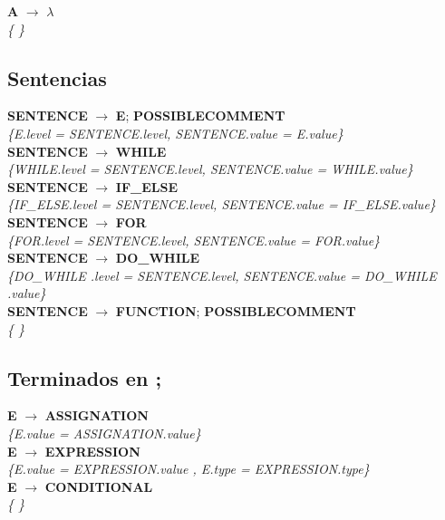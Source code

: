 \documentclass[10pt,a4paper]{article}
\begin{document}
\textbf{A} $\rightarrow$ $\lambda$ \\
\textit{\{   \}} \\

\subsection{Sentencias}
\textbf{SENTENCE} $\rightarrow$ \textbf{E}; \textbf{POSSIBLECOMMENT}\\ 
\textit{\{E.level = SENTENCE.level, SENTENCE.value = E.value\}} \\

\textbf{SENTENCE} $\rightarrow$ \textbf{WHILE} \\ 
\textit{\{WHILE.level = SENTENCE.level, SENTENCE.value = WHILE.value\}} \\

\textbf{SENTENCE} $\rightarrow$ \textbf{IF\_ELSE}  \\ 
\textit{\{IF\_ELSE.level = SENTENCE.level, SENTENCE.value = IF\_ELSE.value\}} \\

\textbf{SENTENCE} $\rightarrow$ \textbf{FOR} \\ 
\textit{\{FOR.level = SENTENCE.level, SENTENCE.value = FOR.value\}} \\

\textbf{SENTENCE} $\rightarrow$ \textbf{DO\_WHILE} \\ 
\textit{\{DO\_WHILE .level = SENTENCE.level, SENTENCE.value = DO\_WHILE .value\}}  \\

\textbf{SENTENCE} $\rightarrow$ \textbf{FUNCTION}; \textbf{POSSIBLECOMMENT} \\
\textit{\{   \}} \\

\subsection{Terminados en ;}

\textbf{E} $\rightarrow$ \textbf{ASSIGNATION}\\
\textit{\{E.value = ASSIGNATION.value\}}\\

\textbf{E} $\rightarrow$ \textbf{EXPRESSION} \\
\textit{\{E.value = EXPRESSION.value  , E.type = EXPRESSION.type\}} \\

\textbf{E} $\rightarrow$ \textbf{CONDITIONAL} \\
\textit{\{   \}} \\
\end{document}
